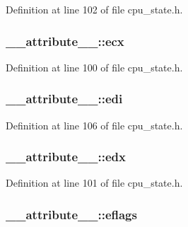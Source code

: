 \-Definition at line 102 of file cpu\-\_\-state.\-h.

\hypertarget{struct____attribute_____a700ac4a41ae10eba5b95a1726ef30dc1}{
\subsubsection[{ecx}]{ {\bf \-\_\-\-\_\-attribute\-\_\-\-\_\-\-::ecx}}}\label{struct____attribute_____a700ac4a41ae10eba5b95a1726ef30dc1}


\-Definition at line 100 of file cpu\-\_\-state.\-h.

\hypertarget{struct____attribute_____a45de583b5b156ad63aa6e9bce36a9946}{
\subsubsection[{edi}]{ {\bf \-\_\-\-\_\-attribute\-\_\-\-\_\-\-::edi}}}\label{struct____attribute_____a45de583b5b156ad63aa6e9bce36a9946}


\-Definition at line 106 of file cpu\-\_\-state.\-h.

\hypertarget{struct____attribute_____a4cb1db234c441f65550db0450026bfab}{
\subsubsection[{edx}]{ {\bf \-\_\-\-\_\-attribute\-\_\-\-\_\-\-::edx}}}\label{struct____attribute_____a4cb1db234c441f65550db0450026bfab}


\-Definition at line 101 of file cpu\-\_\-state.\-h.

\hypertarget{struct____attribute_____af256b3f12c730143ede598d337e67c76}{
\subsubsection[{eflags}]{ {\bf \-\_\-\-\_\-attribute\-\_\-\-\_\-\-::eflags}}}\label{struct____attribute_____af256b3f12c730143ede598d337e67c76}


